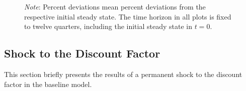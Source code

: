 \documentclass[a4paper,12pt]{article} %
\numberwithin{equation}{section} %
\numberwithin{figure}{section}
\numberwithin{table}{section}
\begin{document}
\begin{refsection}
\begin{appendices}
\begin{figure}[H]
     \vspace{10pt}
     
     \justifying
     \footnotesize
	\textit{Note}: Percent deviations mean percent deviations from the respective initial steady state. The time horizon in all plots is fixed to twelve quarters, including the initial steady state in $t=0$.
\end{figure}

\subsection{Shock to the Discount Factor}
\label{sec-app:robust-beta}

This section briefly presents the results of a permanent shock to the discount factor in the baseline model.

\end{appendices}
\newpage
\thispagestyle{plain}
\renewcommand*{\thepage}{A-\Roman{page}} %

\printbibliography[heading=subbibliography, title={Appendix References}]

\cleardoublepage %

\renewcommand*{\thepage}{\arabic{page}} %

\end{refsection}

\end{document}
